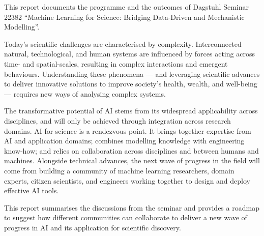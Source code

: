 This report documents the programme and the outcomes of Dagstuhl Seminar 22382 ``Machine Learning for Science: Bridging Data-Driven and Mechanistic Modelling''.

Today's scientific challenges are characterised by complexity.
Interconnected natural, technological, and human systems are influenced
by forces acting across time- and spatial-scales, resulting in complex
interactions and emergent behaviours. Understanding these phenomena ---
and leveraging scientific advances to deliver innovative solutions to
improve society's health, wealth, and well-being --- requires new ways of
analysing complex systems.

The transformative potential of AI stems from its widespread
applicability across disciplines, and will only be achieved through
integration across research domains. AI for science is a rendezvous
point. It brings together expertise from AI and application domains;
combines modelling knowledge with engineering know-how; and relies on
collaboration across disciplines and between humans and machines.
Alongside technical advances, the next wave of progress in the field
will come from building a community of machine learning researchers,
domain experts, citizen scientists, and engineers working together to
design and deploy effective AI tools.

This report summarises the discussions from the seminar and provides a roadmap to suggest how different communities can collaborate to deliver a new wave of progress in AI and its application for scientific discovery.